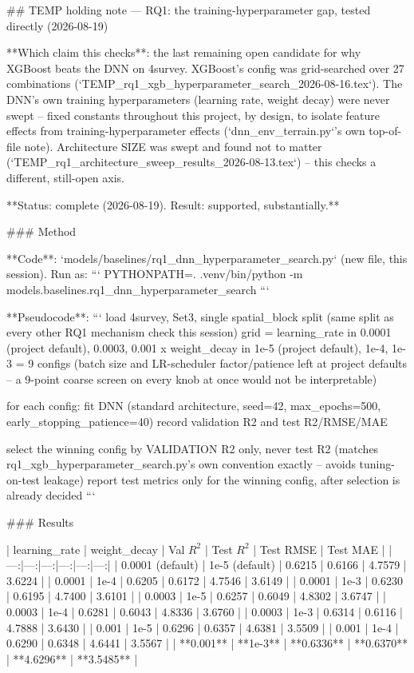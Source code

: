 ## TEMP holding note — RQ1: the training-hyperparameter gap, tested directly (2026-08-19)

**Which claim this checks**: the last remaining open candidate for why XGBoost beats the DNN on
4survey. XGBoost's config was grid-searched over 27 combinations
(`TEMP_rq1_xgb_hyperparameter_search_2026-08-16.tex`). The DNN's own training hyperparameters
(learning rate, weight decay) were never swept -- fixed constants throughout this project,
by design, to isolate feature effects from training-hyperparameter effects (`dnn_env_terrain.py`'s
own top-of-file note). Architecture SIZE was swept and found not to matter
(`TEMP_rq1_architecture_sweep_results_2026-08-13.tex`) -- this checks a different, still-open axis.

**Status: complete (2026-08-19). Result: supported, substantially.**

### Method

**Code**: `models/baselines/rq1_dnn_hyperparameter_search.py` (new file, this session). Run as:
```
PYTHONPATH=. .venv/bin/python -m models.baselines.rq1_dnn_hyperparameter_search
```

**Pseudocode**:
```
load 4survey, Set3, single spatial_block split (same split as every other RQ1 mechanism check
    this session)
grid = learning_rate in {0.0001 (project default), 0.0003, 0.001}
       x weight_decay in {1e-5 (project default), 1e-4, 1e-3}
     = 9 configs (batch size and LR-scheduler factor/patience left at project defaults -- a
       9-point coarse screen on every knob at once would not be interpretable)

for each config:
    fit DNN (standard architecture, seed=42, max_epochs=500, early_stopping_patience=40)
    record validation R2 and test R2/RMSE/MAE

select the winning config by VALIDATION R2 only, never test R2 (matches
    rq1_xgb_hyperparameter_search.py's own convention exactly -- avoids tuning-on-test leakage)
report test metrics only for the winning config, after selection is already decided
```

### Results

| learning\_rate | weight\_decay | Val $R^2$ | Test $R^2$ | Test RMSE | Test MAE |
|---:|---:|---:|---:|---:|---:|
| 0.0001 (default) | 1e-5 (default) | 0.6215 | 0.6166 | 4.7579 | 3.6224 |
| 0.0001 | 1e-4 | 0.6205 | 0.6172 | 4.7546 | 3.6149 |
| 0.0001 | 1e-3 | 0.6230 | 0.6195 | 4.7400 | 3.6101 |
| 0.0003 | 1e-5 | 0.6257 | 0.6049 | 4.8302 | 3.6747 |
| 0.0003 | 1e-4 | 0.6281 | 0.6043 | 4.8336 | 3.6760 |
| 0.0003 | 1e-3 | 0.6314 | 0.6116 | 4.7888 | 3.6430 |
| 0.001 | 1e-5 | 0.6296 | 0.6357 | 4.6381 | 3.5509 |
| 0.001 | 1e-4 | 0.6290 | 0.6348 | 4.6441 | 3.5567 |
| **0.001** | **1e-3** | **0.6336** | **0.6370** | **4.6296** | **3.5485** |

